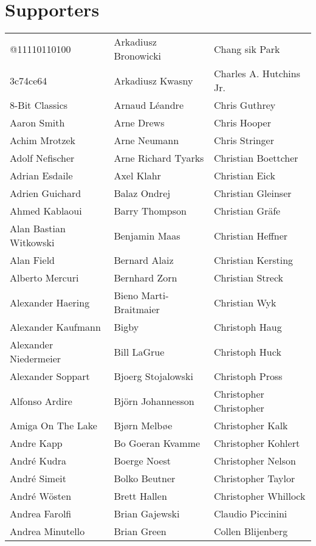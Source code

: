 \newpage
\section{Supporters}

\setlength{\tabcolsep}{1mm}
\begin{tabular}{p{4.5cm}p{4.5cm}p{4.5cm}}
@11110110100 & Arkadiusz Bronowicki & Chang sik Park \\
3c74ce64 & Arkadiusz Kwasny & Charles A. Hutchins Jr. \\
8-Bit Classics & Arnaud Léandre & Chris Guthrey \\
Aaron Smith & Arne Drews & Chris Hooper \\
Achim Mrotzek & Arne Neumann & Chris Stringer \\
Adolf Nefischer & Arne Richard Tyarks & Christian Boettcher \\
Adrian Esdaile & Axel Klahr & Christian Eick \\
Adrien Guichard & Balaz Ondrej & Christian Gleinser \\
Ahmed Kablaoui & Barry Thompson & Christian Gräfe \\
Alan Bastian Witkowski & Benjamin Maas & Christian Heffner \\
Alan Field & Bernard Alaiz & Christian Kersting \\
Alberto Mercuri & Bernhard Zorn & Christian Streck \\
Alexander Haering & Bieno Marti-Braitmaier & Christian Wyk \\
Alexander Kaufmann & Bigby & Christoph Haug \\
Alexander Niedermeier & Bill LaGrue & Christoph Huck \\
Alexander Soppart & Bjoerg Stojalowski & Christoph Pross \\
Alfonso Ardire & Björn Johannesson & Christopher Christopher \\
Amiga On The Lake & Bjørn Melbøe & Christopher Kalk \\
Andre Kapp & Bo Goeran Kvamme & Christopher Kohlert \\
André Kudra & Boerge Noest & Christopher Nelson \\
André Simeit & Bolko Beutner & Christopher Taylor \\
André Wösten & Brett Hallen & Christopher Whillock \\
Andrea Farolfi & Brian Gajewski & Claudio Piccinini \\
Andrea Minutello & Brian Green & Collen Blijenberg \\

\end{tabular}
